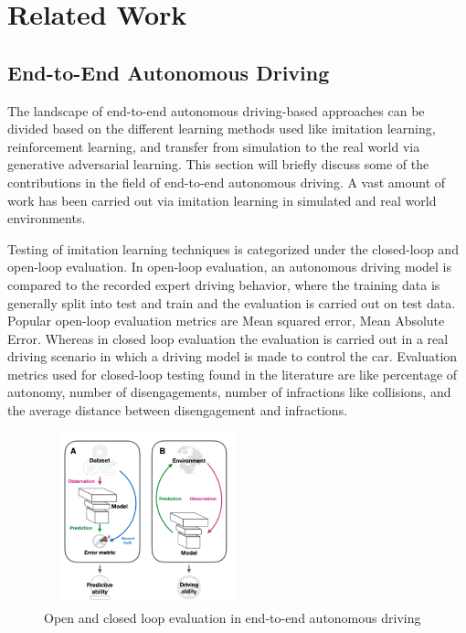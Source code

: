 

    \chapter{Related Work}


    \section{End-to-End Autonomous Driving}
   The landscape of end-to-end autonomous driving-based approaches can be divided based on the different learning methods used like imitation learning, reinforcement learning, and transfer from simulation to the real world via generative adversarial learning.
This section will briefly discuss some of the contributions in the field of end-to-end autonomous driving. A vast amount of work has been carried out via imitation learning in simulated and real world environments. 
\par Testing of imitation learning techniques is categorized under the closed-loop and open-loop evaluation. In open-loop evaluation, an autonomous driving model is compared to the recorded expert driving behavior, where the training data is generally split into test and train and the evaluation is carried out on test data. Popular open-loop evaluation metrics are Mean squared error, Mean Absolute Error. Whereas in closed loop evaluation the evaluation is carried out in a real driving scenario in which a driving model is made to control the car. Evaluation metrics used for closed-loop testing found in the literature are like percentage of autonomy, number of disengagements, number of infractions like collisions, and the average distance between disengagement and infractions.

 \begin{figure}[h]
    \centering
    \includegraphics[width=6cm, height=5cm]{images/open_closed.png}
    \caption{Open and closed loop evaluation in end-to-end autonomous driving \cite{DBLP:journals/corr/abs-2003-06404}}
    \end{figure}

